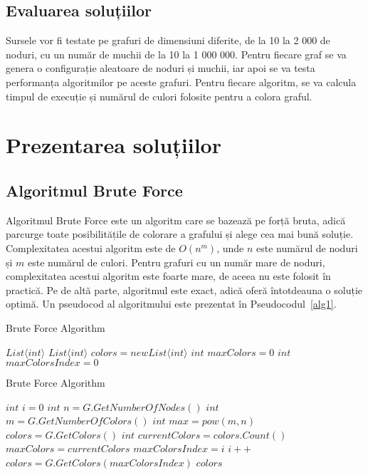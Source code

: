 \documentclass[runningheads]{paper}
\begin{document}
\subsection{Evaluarea soluțiilor}
Sursele vor fi testate pe grafuri de dimensiuni diferite, de la 10 la 2 000 de noduri,
cu un număr de muchii de la 10 la 1 000 000. Pentru fiecare graf se va genera o
configurație aleatoare de noduri și muchii, iar apoi se va testa performanța
algoritmilor pe aceste grafuri. Pentru fiecare algoritm, se va calcula timpul de
execuție și numărul de culori folosite pentru a colora graful.

\section{Prezentarea soluțiilor}
\subsection{Algoritmul Brute Force}
Algoritmul Brute Force este un algoritm care se bazează pe forță bruta, adică
parcurge toate posibilitățile de colorare a grafului și alege cea mai bună
soluție. Complexitatea acestui algoritm este de $O(n^m)$, unde $n$ este numărul de noduri și $m$ este
numărul de culori. Pentru grafuri cu un număr mare de noduri, complexitatea
acestui algoritm este foarte mare, de aceea nu este folosit în practică. Pe de altă parte,
algoritmul este exact, adică oferă întotdeauna o soluție optimă. Un pseudocod al
algoritmului este prezentat în Pseudocodul~\ref{alg1}.

\begin{algorithm}
\caption{Brute Force Algorithm}
\label{alg1}
\begin{algorithmic}[1]
 \Return $List\langle int\rangle $ 
\State $List\langle int\rangle $ $colors = new List\langle int\rangle $ 
\State $int$ $maxColors = 0$ 
\State $int$ $maxColorsIndex = 0$ 
\end{algorithmic}
\end{algorithm}

\addtocounter{algorithm}{-1}
\begin{algorithm}
\caption{Brute Force Algorithm}
\begin{algorithmic}[1]
\State $int$ $i = 0$ 
\State $int$ $n = G.GetNumberOfNodes()$ 
\State $int$ $m = G.GetNumberOfColors()$ 
\State $int$ $max = pow(m, n)$ 
\State $colors = G.GetColors()$
\State $int$ $currentColors = colors.Count()$
\State $maxColors = currentColors$
\State $maxColorsIndex = i$
\EndIf
\State $i++$
\EndWhile
\State $colors = G.GetColors(maxColorsIndex)$
\State \Return $colors$
\EndProcedure
\end{algorithmic}
\end{algorithm}
\end{document}

